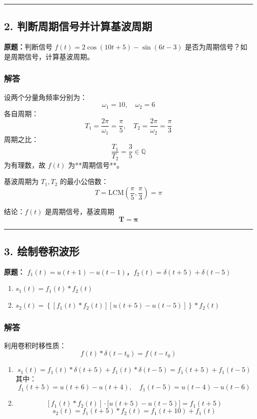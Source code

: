 \vspace{1em}
\hrule
\vspace{1em}

\subsection{2. 判断周期信号并计算基波周期}
\noindent\textbf{原题：}判断信号 $f(t) = 2\cos(10t+5) - \sin(6t-3)$ 是否为周期信号？如是周期信号，计算基波周期。

\subsubsection{解答}
设两个分量角频率分别为：
\[
\omega_1=10,\quad \omega_2=6
\]
各自周期：
\[
T_1 = \frac{2\pi}{\omega_1} = \frac{\pi}{5},\quad
T_2 = \frac{2\pi}{\omega_2} = \frac{\pi}{3}
\]
周期之比：
\[
\frac{T_1}{T_2} = \frac{3}{5} \in \mathbb{Q}
\]
为有理数，故 $f(t)$ 为**周期信号**。

基波周期为 $T_1,T_2$ 的最小公倍数：
\[
T = \text{LCM}\left(\frac{\pi}{5},\frac{\pi}{3}\right) = \pi
\]

结论：$f(t)$ 是周期信号，基波周期
\[
\boldsymbol{T=\pi}
\]

\vspace{1em}
\hrule
\vspace{1em}

\subsection{3. 绘制卷积波形}
\noindent\textbf{原题：}
$f_1(t)=u(t+1)-u(t-1)$，$f_2(t)=\delta(t+5)+\delta(t-5)$
\begin{enumerate}[label=(\arabic*)]
    \item $s_1(t)=f_1(t)*f_2(t)$
    \item $s_2(t)=\left\{\left[f_1(t)*f_2(t)\right]\left[u(t+5)-u(t-5)\right]\right\}*f_2(t)$
\end{enumerate}

\subsubsection{解答}
利用卷积时移性质：
\[
f(t)*\delta(t-t_0)=f(t-t_0)
\]

\begin{enumerate}[label=(\arabic*)]
    \item
    \[
    s_1(t)
    = f_1(t)*\delta(t+5) + f_1(t)*\delta(t-5)
    = f_1(t+5) + f_1(t-5)
    \]
    其中：
    \[
    f_1(t+5)=u(t+6)-u(t+4),\quad
    f_1(t-5)=u(t-4)-u(t-6)
    \]

    \item
    \[
    \left[f_1(t)*f_2(t)\right]\cdot\big[u(t+5)-u(t-5)\big] = f_1(t+5)
    \]
    \[
    s_2(t)
    = f_1(t+5)*f_2(t)
    = f_1(t+10) + f_1(t)
    \]
\end{enumerate}

